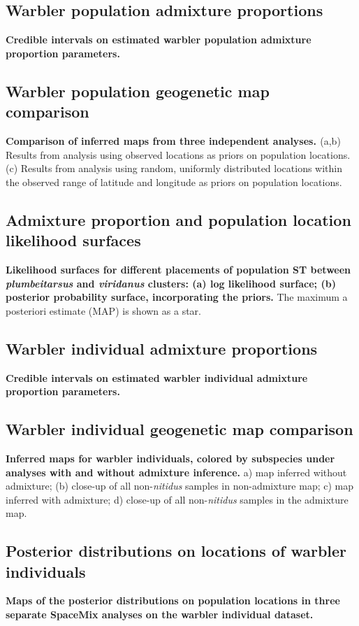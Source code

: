 \documentclass[10pt,letterpaper]{article}
\begin{document}
\subsection*{Warbler population admixture proportions}
\label{warb_pop_adprop}
{\bf{Credible intervals on estimated warbler population admixture proportion parameters.}}

\subsection*{Warbler population geogenetic map comparison}
\label{warbler_pop_compare}
{\bf{Comparison of inferred maps from three independent analyses.	}} (a,b) Results from analysis using observed locations as priors on population locations.  (c) Results from analysis using random, uniformly distributed locations within the observed range of latitude and longitude as priors on population locations.

\subsection*{Admixture proportion and population location likelihood surfaces}
\label{admix_prop_func_loc_lnl}
{\bf{Likelihood surfaces for different placements of population ST between \textit{plumbeitarsus} and \textit{viridanus} clusters: (a) log likelihood surface; (b) posterior probability surface, incorporating the priors.}}  The maximum a posteriori estimate (MAP) is shown as a star. 

\subsection*{Warbler individual admixture proportions}
\label{warb_ind_adprops}
{\bf{Credible intervals on estimated warbler individual admixture proportion parameters.}}

\subsection*{Warbler individual geogenetic map comparison}
\label{warbler_ind_maps_compare}
{\bf{Inferred maps for warbler individuals, colored by subspecies under analyses with and without admixture inference.}} a) map inferred without admixture; (b) close-up of all non-\textit{nitidus} samples in non-admixture map; c) map inferred with admixture; d) close-up of all non-\textit{nitidus} samples in the admixture map.

\subsection*{Posterior distributions on locations of warbler individuals}
\label{warb_ind_clouds}
{\bf{Maps of the posterior distributions on population locations in three separate SpaceMix analyses on the warbler individual dataset.}}
\end{document}

